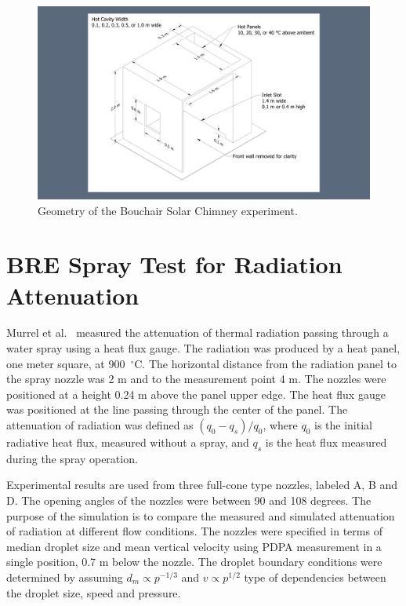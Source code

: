 \begin{figure}[!ht]
\includegraphics[trim={16in 2.5in 16in 2.5in},clip,width=\textwidth]{FIGURES/Bouchair_Solar_Chimney/Bouchair_Solar_Chimney}
\caption[Geometry of the Bouchair Solar Chimney experiment]{Geometry of the Bouchair Solar Chimney experiment.}
\label{Bouchair_Drawing}
\end{figure}



\section{BRE Spray Test for Radiation Attenuation}

Murrel et al.~\cite{Murrel:1995} measured the attenuation of thermal radiation passing through a water
spray using a heat flux gauge. The radiation was produced by a heat panel, one meter square, at 900~$^\circ$C. The horizontal distance
from the radiation panel to the spray nozzle was 2 m and to the measurement point 4 m. The nozzles were positioned at
a height 0.24 m above the panel upper edge. The heat flux gauge was positioned at the line passing through the center
of the panel. The attenuation of radiation was defined as $(q_0-q_s)/q_0$, where $q_0$ is the initial radiative heat flux,
measured without a spray, and $q_s$ is the heat flux measured during the spray operation.

Experimental results are used from three full-cone type nozzles, labeled A, B and D. The opening angles of the nozzles were between 90 and 108 degrees.
The purpose of the simulation is to compare the measured and simulated attenuation of radiation at different flow conditions. The nozzles were
specified in terms of median droplet size and mean vertical velocity using PDPA measurement in a single position, 0.7 m below the nozzle. The droplet
boundary conditions were determined by assuming $d_m \propto p^{-1/3}$ and $v \propto p^{1/2}$ type of dependencies between the droplet size, speed
and pressure.

